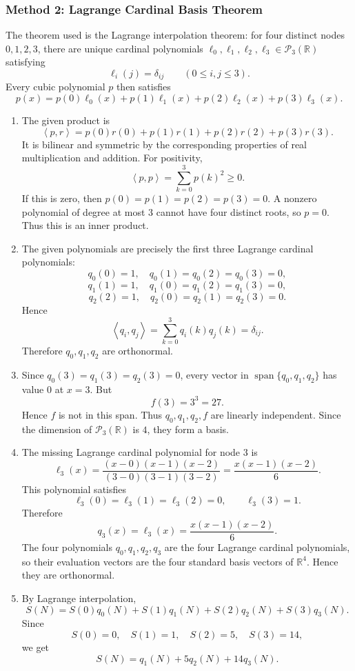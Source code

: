 \documentclass[12pt]{article}
\newcommand{\R}{\mathbb{R}}
\newcommand{\Ppoly}{\mathcal{P}}
\newcommand{\Span}{\operatorname{span}}
\newcommand{\ip}[2]{\left\langle #1,#2\right\rangle}
\begin{document}
\newpage
\subsubsection{Method 2: Lagrange Cardinal Basis Theorem}
The theorem used is the Lagrange interpolation theorem: for four distinct nodes $0,1,2,3$, there are unique cardinal polynomials $\ell_0,\ell_1,\ell_2,\ell_3\in\Ppoly_3(\R)$ satisfying
\[
\ell_i(j)=\delta_{ij}
\qquad(0\le i,j\le3).
\]
Every cubic polynomial $p$ then satisfies
\[
p(x)=p(0)\ell_0(x)+p(1)\ell_1(x)+p(2)\ell_2(x)+p(3)\ell_3(x).
\]

\begin{enumerate}[label=(\alph*)]
  \item The given product is
  \[
  \ip{p}{r}=p(0)r(0)+p(1)r(1)+p(2)r(2)+p(3)r(3).
  \]
  It is bilinear and symmetric by the corresponding properties of real multiplication and addition. For positivity,
  \[
  \ip{p}{p}=\sum_{k=0}^{3}p(k)^2\ge0.
  \]
  If this is zero, then $p(0)=p(1)=p(2)=p(3)=0$. A nonzero polynomial of degree at most $3$ cannot have four distinct roots, so $p=0$. Thus this is an inner product.

  \item The given polynomials are precisely the first three Lagrange cardinal polynomials:
  \[
  q_0(0)=1,
  \quad q_0(1)=q_0(2)=q_0(3)=0,
  \]
  \[
  q_1(1)=1,
  \quad q_1(0)=q_1(2)=q_1(3)=0,
  \]
  \[
  q_2(2)=1,
  \quad q_2(0)=q_2(1)=q_2(3)=0.
  \]
  Hence
  \[
  \ip{q_i}{q_j}=\sum_{k=0}^{3}q_i(k)q_j(k)=\delta_{ij}.
  \]
  Therefore $q_0,q_1,q_2$ are orthonormal.

  \item Since $q_0(3)=q_1(3)=q_2(3)=0$, every vector in $\Span\{q_0,q_1,q_2\}$ has value $0$ at $x=3$. But
  \[
  f(3)=3^3=27.
  \]
  Hence $f$ is not in this span. Thus $q_0,q_1,q_2,f$ are linearly independent. Since the dimension of $\Ppoly_3(\R)$ is $4$, they form a basis.

  \item The missing Lagrange cardinal polynomial for node $3$ is
  \[
  \ell_3(x)=\frac{(x-0)(x-1)(x-2)}{(3-0)(3-1)(3-2)}=\frac{x(x-1)(x-2)}6.
  \]
  This polynomial satisfies
  \[
  \ell_3(0)=\ell_3(1)=\ell_3(2)=0,
  \qquad
  \ell_3(3)=1.
  \]
  Therefore
  \[
  q_3(x)=\ell_3(x)=\frac{x(x-1)(x-2)}6.
  \]
  The four polynomials $q_0,q_1,q_2,q_3$ are the four Lagrange cardinal polynomials, so their evaluation vectors are the four standard basis vectors of $\R^4$. Hence they are orthonormal.

  \item By Lagrange interpolation,
  \[
  S(N)=S(0)q_0(N)+S(1)q_1(N)+S(2)q_2(N)+S(3)q_3(N).
  \]
  Since
  \[
  S(0)=0,
  \quad S(1)=1,
  \quad S(2)=5,
  \quad S(3)=14,
  \]
  we get
  \[
  \boxed{S(N)=q_1(N)+5q_2(N)+14q_3(N).}
  \]
\end{enumerate}
\end{document}
